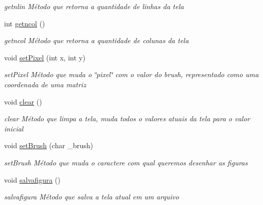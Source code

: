 \begin{DoxyCompactItemize}
\begin{DoxyCompactList}\small\item\em getnlin Método que retorna a quantidade de linhas da tela \end{DoxyCompactList}\item 
int \mbox{\hyperlink{class_screen_abaae93e39587a865d4ac1f7fa1a501c2}{getncol}} ()
\begin{DoxyCompactList}\small\item\em getncol Método que retorna a quantidade de colunas da tela \end{DoxyCompactList}\item 
void \mbox{\hyperlink{class_screen_ae6bea81c57a22d226507c3c26fa95ee0}{set\+Pixel}} (int x, int y)
\begin{DoxyCompactList}\small\item\em set\+Pixel Método que muda o \char`\"{}pixel\char`\"{} com o valor do \textquotesingle{}brush\textquotesingle{}, representado como uma coordenada de uma matriz \end{DoxyCompactList}\item 
\mbox{\label{class_screen_a35e74266b2a04e37b354ceff7a5f1031}} 
void \mbox{\hyperlink{class_screen_a35e74266b2a04e37b354ceff7a5f1031}{clear}} ()
\begin{DoxyCompactList}\small\item\em clear Método que limpa a tela, muda todos o valores atuais da tela para o valor inicial \end{DoxyCompactList}\item 
void \mbox{\hyperlink{class_screen_aebc4eb6cb5acf15a0f04c1494622ab23}{set\+Brush}} (char \+\_\+brush)
\begin{DoxyCompactList}\small\item\em set\+Brush Método que muda o caractere com qual queremos desenhar as figuras \end{DoxyCompactList}\item 
\mbox{\label{class_screen_ad0d7ac072702d42e6a920a806fbc79e2}} 
void \mbox{\hyperlink{class_screen_ad0d7ac072702d42e6a920a806fbc79e2}{salvafigura}} ()
\begin{DoxyCompactList}\small\item\em salvafigura Método que salva a tela atual em um arquivo \end{DoxyCompactList}\end{DoxyCompactItemize}

